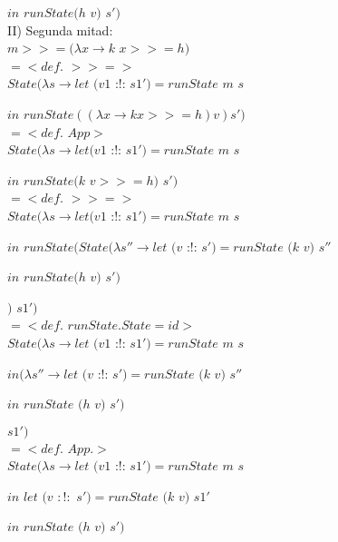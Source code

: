 \documentclass[12pt, titlepage]{article}
\begin{document}
\hspace{45pt}$in$ $runState (h$ $v)$ $s')$\\


\noindent II) Segunda mitad:\\
$m >>= (\lambda x \rightarrow k$ $x >>= h )$\\
$=<def.$ $>>=>$\\
$State (\lambda s \rightarrow let$ $(v1$ :!: $s1') = runState$ $m$ $s$

\hspace{45pt} $in$ $runState ((\lambda x \rightarrow k x >>= h ) v) s')$\\
$=<def.$ $App>$\\
$State (\lambda s \rightarrow let (v1$ :!: $s1') = runState$ $m$ $s$

\hspace{40pt}$in$ $runState (k$ $v >>= h )$ $s')$\\
$=<def.$ $>>=>$\\
\newpage
\noindent $State (\lambda s \rightarrow let (v1$ :!: $s1') = runState$ $m$ $s$

\hspace{43pt}$in$ $runState ( State (\lambda s'' \rightarrow let$ $(v$ :!: $s') = runState$ $(k$ $v)$ $s''$

\hspace{175pt} $in$ $runState (h$ $v)$ $s')$

\hspace{101pt} $)$ $s1')$\\
$=<def.$ $runState.State = id>$\\
$State (\lambda s \rightarrow let$ $(v1$ :!: $s1') = runState$ $m$ $s$

\hspace{45pt}$in (\lambda s'' \rightarrow let$ $(v$ :!: $s') = runState$ $(k$ $v)$ $s''$

\hspace{92pt} $in$ $runState$ $(h$ $v)$ $s')$

\hspace{50pt} $s1')$\\
$=<def.$ $App.>$\\
$State (\lambda s \rightarrow let$ $(v1$ :!: $s1') = runState$ $m$ $s$

\hspace{43pt} $in$ $let$ $(v$ $:!:$ $s') = runState$ $(k$ $v)$ $s1'$

\hspace{56pt} $in$ $runState$ $(h$ $v)$ $s')$\\
\end{document}
